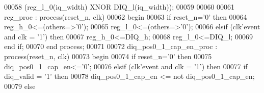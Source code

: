 \begin{DoxyCode}
00058                \textcolor{vhdlchar}{(}\textcolor{vhdlchar}{reg_l_0}\textcolor{vhdlchar}{(}\textcolor{vhdlchar}{iq_width}\textcolor{vhdlchar}{)} \textcolor{keywordflow}{XNOR} \textcolor{vhdlchar}{DIQ_l}\textcolor{vhdlchar}{(}\textcolor{vhdlchar}{iq_width}\textcolor{vhdlchar}{)}\textcolor{vhdlchar}{)};
00059 
00060 
00061  reg\_proc : \textcolor{keywordflow}{process}(reset_n, clk)
00062 \textcolor{vhdlkeyword}{    begin}
00063       \textcolor{keywordflow}{if} \textcolor{vhdlchar}{reset_n}\textcolor{vhdlchar}{=}\textcolor{vhdlchar}{'}\textcolor{vhdllogic}{}\textcolor{vhdllogic}{0}\textcolor{vhdlchar}{'} \textcolor{keywordflow}{then}
00064             reg\_h\_0<=(others=>'0');
00065          reg\_l\_0<=(others=>'0');
00066       \textcolor{keywordflow}{elsif} \textcolor{vhdlchar}{(}\textcolor{vhdlchar}{clk}\textcolor{vhdlchar}{'}\textcolor{vhdlkeyword}{event} \textcolor{keywordflow}{and} \textcolor{vhdlchar}{clk} \textcolor{vhdlchar}{=} \textcolor{vhdlchar}{'}\textcolor{vhdllogic}{}\textcolor{vhdllogic}{1}\textcolor{vhdlchar}{'}\textcolor{vhdlchar}{)} \textcolor{keywordflow}{then}
00067             reg\_h\_0<=DIQ\_h; 
00068          reg\_l\_0<=DIQ\_l; 
00069         \textcolor{keywordflow}{end} \textcolor{keywordflow}{if};
00070     \textcolor{keywordflow}{end} \textcolor{keywordflow}{process};
00071     
00072  diq\_pos0\_1\_cap\_en\_proc : \textcolor{keywordflow}{process}(reset_n, clk)
00073 \textcolor{vhdlkeyword}{    begin}
00074       \textcolor{keywordflow}{if} \textcolor{vhdlchar}{reset_n}\textcolor{vhdlchar}{=}\textcolor{vhdlchar}{'}\textcolor{vhdllogic}{}\textcolor{vhdllogic}{0}\textcolor{vhdlchar}{'} \textcolor{keywordflow}{then}
00075          \textcolor{vhdlchar}{diq_pos0_1_cap_en}\textcolor{vhdlchar}{<=}\textcolor{vhdlchar}{'}\textcolor{vhdllogic}{}\textcolor{vhdllogic}{0}\textcolor{vhdlchar}{'};
00076       \textcolor{keywordflow}{elsif} \textcolor{vhdlchar}{(}\textcolor{vhdlchar}{clk}\textcolor{vhdlchar}{'}\textcolor{vhdlkeyword}{event} \textcolor{keywordflow}{and} \textcolor{vhdlchar}{clk} \textcolor{vhdlchar}{=} \textcolor{vhdlchar}{'}\textcolor{vhdllogic}{}\textcolor{vhdllogic}{1}\textcolor{vhdlchar}{'}\textcolor{vhdlchar}{)} \textcolor{keywordflow}{then}
00077          \textcolor{keywordflow}{if} \textcolor{vhdlchar}{diq_valid} \textcolor{vhdlchar}{=} \textcolor{vhdlchar}{'}\textcolor{vhdllogic}{}\textcolor{vhdllogic}{1}\textcolor{vhdlchar}{'} \textcolor{keywordflow}{then} 
00078             \textcolor{vhdlchar}{diq_pos0_1_cap_en} \textcolor{vhdlchar}{<=} \textcolor{keywordflow}{not} \textcolor{vhdlchar}{diq_pos0_1_cap_en};
00079          \textcolor{keywordflow}{else} 

\end{DoxyCode}
